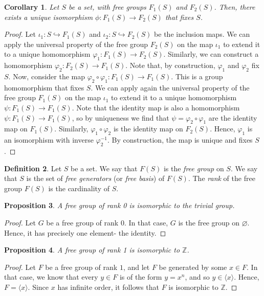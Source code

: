 \documentclass[a4paper, openany]{memoir}
\theoremstyle{definition}
\newtheorem{definition}{Definition}[section]
\theoremstyle{plain}
\newtheorem{proposition}[definition]{Proposition}
\newtheorem{corollary}[definition]{Corollary}
\begin{document}
    \begin{corollary}
        Let $S$ be a set, with free groups $F_1(S)$ and $F_2(S)$. Then, there exists a unique isomorphism $\phi \colon F_1(S) \to F_2(S)$ that fixes $S$.
    \end{corollary}
    \begin{proof}
        Let $\iota_1 \colon S \hookrightarrow F_1(S)$ and $\iota_2 \colon S \hookrightarrow F_2(S)$ be the inclusion maps. We can apply the universal property of the free group $F_2(S)$ on the map $\iota_1$ to extend it to a unique homomorphism $\varphi_1 \colon F_1(S) \to F_2(S)$. Similarly, we can construct a homomorphism $\varphi_2 \colon F_2(S) \to F_1(S)$. Note that, by construction, $\varphi_1$ and $ \varphi_2$ fix $S$. Now, consider the map $\varphi_2 \circ \varphi_1 \colon F_1(S) \to F_1(S)$. This is a group homomorphism that fixes $S$. We can apply again the universal property of the free group $F_1(S)$ on the map $\iota_1$ to extend it to a unique homomorphism $\psi \colon F_1(S) \to F_1(S)$. Note that the identity map is also a homomorphism $\psi \colon F_1(S) \to F_1(S)$, so by uniqueness we find that $\psi = \varphi_2 \circ \varphi_1$ are the identity map on $F_1(S)$. Similarly, $\varphi_1 \circ \varphi_2$ is the identity map on $F_2(S)$. Hence, $\varphi_1$ is an isomorphism with inverse $\varphi_2^{-1}$. By construction, the map is unique and fixes $S$.
    \end{proof}
    
    \begin{definition}
        Let $S$ be a set. We say that $F(S)$ is the \emph{free group} on $S$. We say that $S$ is the set of \emph{free generators} (or \emph{free basis}) of $F(S)$. The \emph{rank} of the free group $F(S)$ is the cardinality of $S$.
    \end{definition}

    \begin{proposition}
        A free group of rank 0 is isomorphic to the trivial group.
    \end{proposition}
    \begin{proof}
        Let $G$ be a free group of rank 0. In that case, $G$ is the free group on $\varnothing$. Hence, it has precisely one element- the identity.
    \end{proof}
    
    \begin{proposition}
        A free group of rank 1 is isomorphic to $\mathbb{Z}$.
    \end{proposition}
    \begin{proof}
        Let $F$ be a free group of rank $1$, and let $F$ be generated by some $x \in F$. In that case, we know that every $y \in F$ is of the form $y = x^n$, and so $y \in \langle x \rangle$. Hence, $F = \langle x \rangle$. Since $x$ has infinite order, it follows that $F$ is isomorphic to $\mathbb{Z}$.
    \end{proof}
\end{document}
